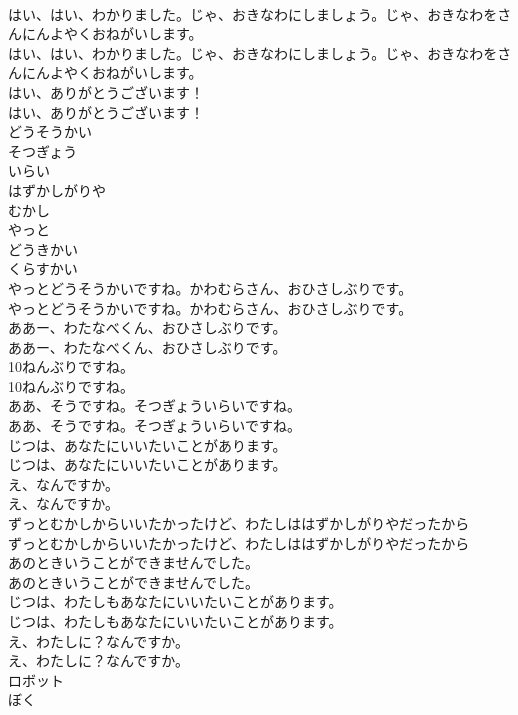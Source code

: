 \documentclass[8pt]{extreport}
\begin{document}
\begin{CJK}{UTF8}{min}
\\	はい、はい、わかりました。じゃ、おきなわにしましょう。じゃ、おきなわをさんにんよやくおねがいします。	
\\	はい、はい、わかりました。じゃ、おきなわにしましょう。じゃ、おきなわをさんにんよやくおねがいします。 
\\	はい、ありがとうございます！	
\\	はい、ありがとうございます！ 
\\	どうそうかい
\\	そつぎょう
\\	いらい
\\	はずかしがりや
\\	むかし
\\	やっと
\\	どうきかい
\\	くらすかい
\\	やっとどうそうかいですね。かわむらさん、おひさしぶりです。	
\\	やっとどうそうかいですね。かわむらさん、おひさしぶりです。 
\\	ああー、わたなべくん、おひさしぶりです。	
\\	ああー、わたなべくん、おひさしぶりです。 
\\	10ねんぶりですね。	
\\	10ねんぶりですね。 
\\	ああ、そうですね。そつぎょういらいですね。	
\\	ああ、そうですね。そつぎょういらいですね。 
\\	じつは、あなたにいいたいことがあります。	
\\	じつは、あなたにいいたいことがあります。 
\\	え、なんですか。	
\\	え、なんですか。 
\\	ずっとむかしからいいたかったけど、わたしははずかしがりやだったから	
\\	ずっとむかしからいいたかったけど、わたしははずかしがりやだったから 
\\	あのときいうことができませんでした。	
\\	あのときいうことができませんでした。 
\\	じつは、わたしもあなたにいいたいことがあります。	
\\	じつは、わたしもあなたにいいたいことがあります。 
\\	え、わたしに？なんですか。	
\\	え、わたしに？なんですか。 
\\	ロボット
\\	ぼく

\end{CJK}
\end{document}
